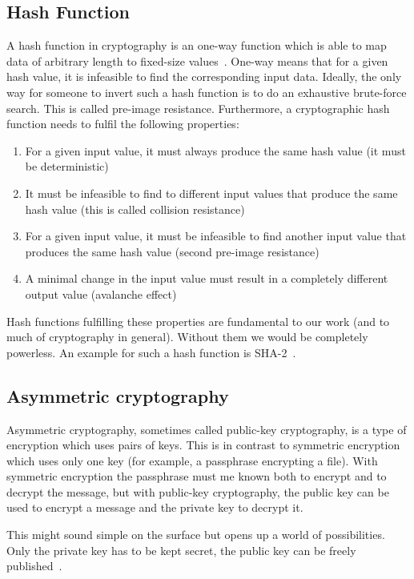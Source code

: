 \subsection{Hash Function}\label{subsec:hash-function}
A hash function in cryptography is an one-way function which is able to map data of arbitrary length to fixed-size values~\cite{hashing}.
One-way means that for a given hash value, it is infeasible to find the corresponding input data.
Ideally, the only way for someone to invert such a hash function is to do an exhaustive brute-force search.
This is called pre-image resistance.
Furthermore, a cryptographic hash function needs to fulfil the following properties:
\begin{enumerate}
    \item For a given input value, it must always produce the same hash value (it must be deterministic)
    \item It must be infeasible to find to different input values that produce the same hash value (this is called collision resistance)
    \item For a given input value, it must be infeasible to find another input value that produces the same hash value (second pre-image resistance)
    \item A minimal change in the input value must result in a completely different output value (avalanche effect)
\end{enumerate}

Hash functions fulfilling these properties are fundamental to our work (and to much of cryptography in general).
Without them we would be completely powerless.
An example for such a hash function is \gls{SHA-2}~\cite{sha2patent}.

\subsection{Asymmetric cryptography}\label{subsec:asymmetric-cryptography}
Asymmetric cryptography, sometimes called public-key cryptography, is a type of encryption which uses pairs of keys.
This is in contrast to symmetric encryption which uses only one key (for example, a passphrase encrypting a file).
With symmetric encryption the passphrase must me known both to encrypt and to decrypt the message,
but with public-key cryptography, the public key can be used to encrypt a message and the private key to decrypt it.

This might sound simple on the surface but opens up a world of possibilities.
Only the private key has to be kept secret, the public key can be freely published~\cite{stallings}.

